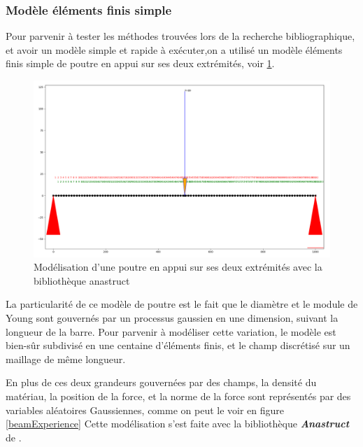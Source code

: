 \documentclass[a4paper,10pt]{article}
\begin{document}
\subsubsection{Modèle éléments finis simple}
Pour parvenir à tester les méthodes trouvées lors de la recherche bibliographique, et avoir un modèle simple et rapide à exécuter,on a utilisé un modèle éléments finis simple de poutre en appui sur ses deux extrémités, voir \ref{poutreFlexion}.

\begin{figure}[H]
   \centering   
   \includegraphics[width=\linewidth]{beam_structure.png}
      \caption{Modélisation d'une poutre en appui sur ses deux extrémités avec la bibliothèque anastruct}
         \label{poutreFlexion}
\end{figure}

La particularité de ce modèle de poutre est le fait que le diamètre et le module de Young sont gouvernés par un processus gaussien en une dimension, suivant la longueur de la barre. Pour parvenir à modéliser cette variation, le modèle est bien-sûr subdivisé en une centaine d'éléments finis, et le champ discrétisé sur un maillage de même longueur. \smallskip

En plus de ces deux grandeurs gouvernées par des champs, la densité du matériau, la position de la force, et la norme de la force sont représentés par des variables aléatoires Gaussiennes, comme on peut le voir en figure \ref{beamExperience} Cette modélisation s’est faite avec la bibliothèque \textbf{\textit{Anastruct}} de \cite{Vink2020Feb}.
\end{document}
